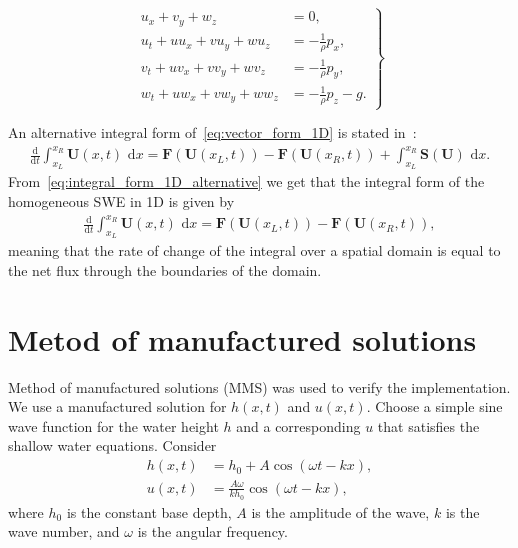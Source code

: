 \begin{equation}\label{eq:momentum_conservation_all}
    \left.
    \begin{aligned}
        u_x + v_y + w_z &= 0, \\
        u_t + u u_x + v u_y + w u_z &= - \frac{1}{\rho} p_x, \\
        v_t + u v_x + v v_y + w v_z &= - \frac{1}{\rho} p_y, \\
        w_t + u w_x + v w_y + w w_z &= - \frac{1}{\rho} p_z - g.
    \end{aligned}
    \right\}
\end{equation}

An alternative integral form of~\eqref{eq:vector_form_1D} is stated in~\cite{Toro2024}:
\begin{align}\label{eq:integral_form_1D_alternative}
    \frac{\text{d}}{\text{d}t} \int_{x_L}^{x_R} \mathbf{U}(x,t) \text{ d}x = \mathbf{F}(\mathbf{U}(x_L, t)) - \mathbf{F}(\mathbf{U}(x_R, t)) + \int_{x_L}^{x_R} \mathbf{S}(\mathbf{U}) \text{ d}x.
\end{align}
From~\eqref{eq:integral_form_1D_alternative} we get that the integral form of the homogeneous SWE in 1D is given by
\begin{align}\label{eq:integral_form_1D_homogeneous}
    \frac{\text{d}}{\text{d}t} \int_{x_L}^{x_R} \mathbf{U}(x,t) \text{ d}x = \mathbf{F}(\mathbf{U}(x_L, t)) - \mathbf{F}(\mathbf{U}(x_R, t)),
\end{align}
meaning that the rate of change of the integral over a spatial domain is equal to the net flux through the boundaries of the domain.











\section{Metod of manufactured solutions}
Method of manufactured solutions (MMS) was used to verify the implementation.
We use a manufactured solution for $h(x,t)$ and $u(x,t)$.
Choose a simple sine wave function for the water height $h$ and a corresponding $u$ that satisfies the shallow water equations.
Consider
\begin{align*}
    h(x,t) &= h_0 + A \cos(\omega t - kx), \\
    u(x,t) &= \frac{ A \omega }{k h_0}  \cos(\omega t - kx),
\end{align*} 
where $h_0$ is the constant base depth, $A$ is the amplitude of the wave, $k$ is the wave number, and $\omega$ is the angular frequency.

